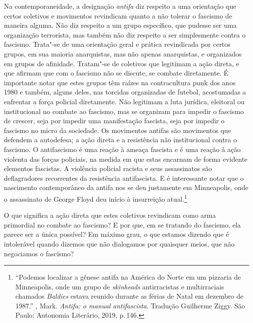 Na contemporaneidade, a designação \emph{antifa} diz respeito a uma
orientação que certos coletivos e movimentos revindicam quanto a não
tolerar o fascismo de maneira alguma. Não diz respeito a um grupo
específico, que pudesse ser uma organização terrorista, mas também não
diz respeito a ser simplesmente contra o fascismo. Trata"-se de uma
orientação geral e prática revindicada por certos grupos, em sua maioria
anarquistas, mas não apenas anarquistas, e organizados em grupos de
afinidade. Tratam"-se de coletivos que legitimam a ação direta, e que
afirmam que com o fascismo não se discute, se combate diretamente. É
importante notar que estes grupos têm raízes na contracultura punk dos
anos 1980 e também, alguns deles, nas torcidas organizadas de futebol,
acostumadas a enfrentar a força policial diretamente. Não legitimam a
luta jurídica, eleitoral ou institucional no combate ao fascismo, mas
se organizam para impedir o fascismo de crescer, seja por impedir
uma manifestação fascista, seja por impedir o fascismo no micro da
sociedade. Os movimentos antifas são movimentos que defendem a
autodefesa; a ação direta e a resistência não institucional contra o
fascismo. O antifascismo é uma reação à ameaça fascista e é uma reação à
ação violenta das forças policiais, na medida em que estas encarnam de
forma evidente elementos fascistas. A violência policial racista e seus
assassinatos são deflagradores recorrentes da resistência antifascista.
E é interessante notar que o nascimento contemporâneo da antifa
nos  se deu justamente em Minneapolis, onde o assassinato de George
Floyd deu início à insurreição atual.\footnote{``Podemos localizar a
  gênese antifa na América do Norte em um pizzaria de Minneapolis, onde
  um grupo de \emph{skinheads} antirracistas e multirraciais chamados \emph{Baldies}
  estava reunido durante as férias de Natal em dezembro de 1987.'' ,
  Mark. \emph{Antifa: o manual antifascista}. Tradução Guilherme Ziggy. São
  Paulo: Autonomia Literário, 2019, p.\,146.}

O que significa a ação direta que estes coletivos revindicam como arma
primordial no combate ao fascismo? E por que, em se tratando do
fascismo, ela parece ser a única possível? Em máximo grau, o que estamos
dizendo que é intolerável quando dizemos que não dialogamos por
quaisquer meios, que não negociamos o fascismo?

